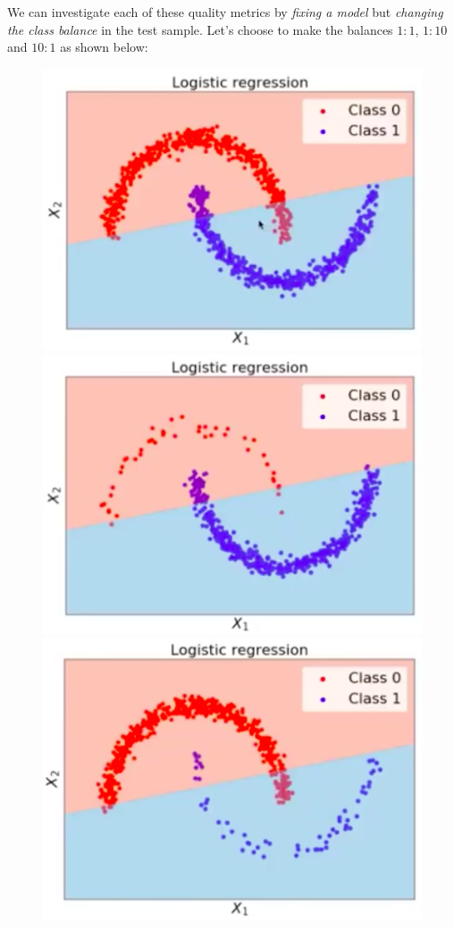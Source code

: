 \newpage
\begin{frameex}
We can investigate each of these quality metrics by \textit{fixing a model} but \textit{changing the class balance} in the test sample. Let's choose to make the balances $1:1$, $1:10$ and $10:1$ as shown below:
\begin{figure}[H]
\centering
\includegraphics[scale=0.3]{oneoneratio.png}
\includegraphics[scale=0.3]{onetenratio.png}
\includegraphics[scale=0.3]{tenoneratio.png}

\end{figure}
\end{frameex}
